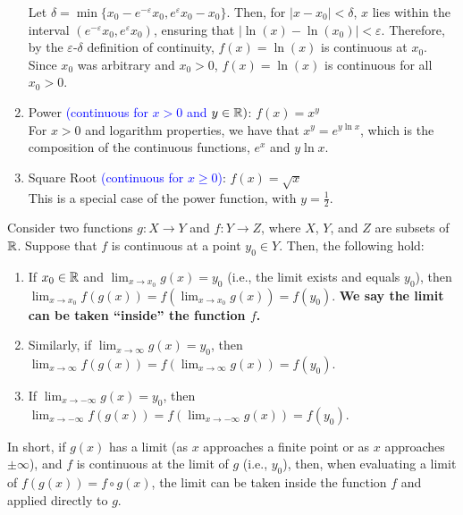 \begin{enumerate}
Let $\delta = \min\{x_0 - e^{-\varepsilon}x_0, e^{\varepsilon}x_0 - x_0\}$. Then, for $|x - x_0| < \delta$, $x$ lies within the interval $(e^{-\varepsilon}x_0, e^{\varepsilon}x_0)$, ensuring that $|\ln(x) - \ln(x_0)| < \varepsilon$. Therefore, by the $\varepsilon$-$\delta$ definition of continuity, $f(x) = \ln(x)$ is continuous at $x_0$. Since $x_0$ was arbitrary and $x_0 > 0$, $f(x) = \ln(x)$ is continuous for all $x_0 > 0$. 
\Qed


\item Power \textcolor{blue}{(continuous for $x > 0$ and $y \in \mathbb R)$}: $ f(x) = x^y $\\

For $x > 0$ and logarithm properties, we have that $x^y= e^{y \ln x}$, which is the composition of the continuous functions, $e^x$ and $y \ln x$.
\Qed

\item Square Root \textcolor{blue}{(continuous for $ x \geq 0 $)}: $ f(x) = \sqrt{x} $\\

  This is a special case of the power function, with $y=\frac{1}{2}$.
  \Qed

\end{enumerate}

\bigskip

    \begin{tcolorbox}[title= \textcolor{black}{Proof of Prop.~\ref{thm:LimitInsideFunction} (Taking Limits Inside a Function)}, sharp corners, colback=green!30, colframe=green!80!blue, breakable, fonttitle=\bfseries]
    
    Consider two functions $g:X \to Y$ and $f:Y \to Z$, where $X$, $Y$, and $Z$ are subsets of $\mathbb R$. Suppose that $f$ is continuous at a point $y_0 \in Y$. Then, the following hold:
\begin{enumerate}
\renewcommand{\labelenumi}{(\alph{enumi})}
\setlength{\itemsep}{.2cm}

\item If $x_0 \in \mathbb R$ and $\displaystyle \lim_{x \to x_0} g(x) = y_0$ (i.e., the limit exists and equals $y_0$), then $\displaystyle \lim_{x \to x_0} f(g(x)) = f(\lim_{x \to x_0} g(x)) = f(y_0). $ \textbf{We say the limit can be taken ``inside'' the function $f$.}

\item Similarly, if $\displaystyle \lim_{x \to \infty} g(x) = y_0$, then $\displaystyle \lim_{x \to \infty} f(g(x)) = f(\lim_{x \to \infty} g(x)) = f(y_0). $  

\item If $\displaystyle \lim_{x \to -\infty} g(x) = y_0$, then $\displaystyle \lim_{x \to -\infty} f(g(x)) = f(\lim_{x \to -\infty} g(x)) = f(y_0). $ 
\end{enumerate}
In short, if $g(x)$ has a limit (as $x$ approaches a finite point or as $x$ approaches $\pm \infty$), and $f$ is continuous at the limit of $g$ (i.e., $y_0$), then, when evaluating a limit of $f(g(x)) = f\circ g(x)$,  the limit can be taken inside the function $f$ and applied directly to $g$.  
\end{tcolorbox}

